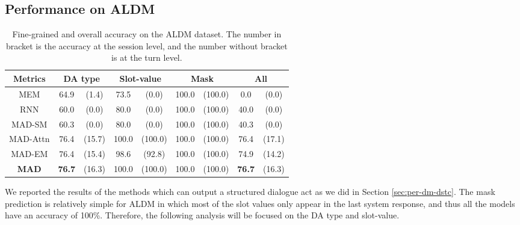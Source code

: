 

\subsection{Performance on ALDM}
\begin{table}[htbp]
\small
\begin{center}
\begin{tabular}{ c | c c | c c | c c | c c}
  \hline
    Metrics & \multicolumn{2}{c|}{DA type} & \multicolumn{2}{c|}{Slot-value} & \multicolumn{2}{c|}{Mask} & \multicolumn{2}{c}{All}\\
  \hline
    MEM & 64.9 & (1.4) & 73.5 & (0.0) & 100.0 & (100.0) & 0.0 & (0.0)\\
    RNN & 60.0 & (0.0) & 80.0 & (0.0) & 100.0 & (100.0) & 40.0 & (0.0)\\
    MAD-SM & 60.3 & (0.0) & 80.0 & (0.0) & 100.0 & (100.0) & 40.3 & (0.0)\\
    MAD-Attn & 76.4 & (15.7) & 100.0 & (100.0) & 100.0 & (100.0) & 76.4 & (17.1)\\
    MAD-EM & 76.4 & (15.4) & 98.6 & (92.8) & 100.0 & (100.0) & 74.9 & (14.2)\\
  \hline
    {\bf MAD} & {\bf 76.7} & (16.3) & 100.0 & (100.0) & 100.0 & (100.0) & {\bf 76.7} & (16.3)\\
  \hline
\end{tabular}
\end{center}
\caption{\label{tab:aldm}Fine-grained and overall accuracy on the ALDM dataset. The number in 
bracket is the accuracy at the session level, and the number without bracket is at the turn level.}
\end{table}

We reported the results of the methods which can output a structured dialogue act as we did in Section \ref{sec:per-dm-dstc}. The mask prediction is relatively simple for ALDM in which most of the slot values only appear in the last system response, and thus all the models have an accuracy of 100\%. Therefore, the following analysis will be focused on the DA type and slot-value.

